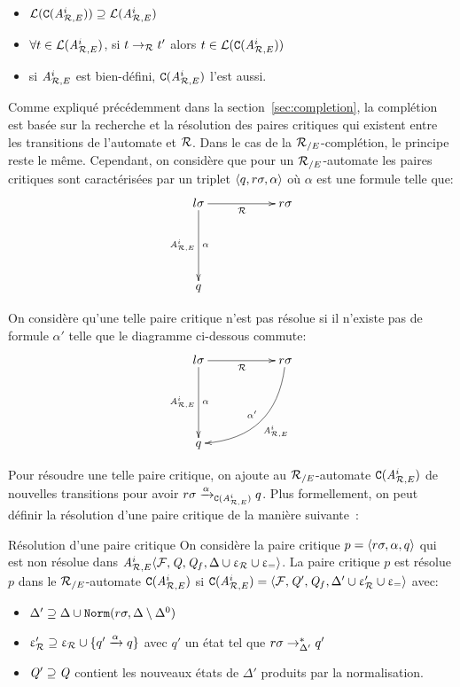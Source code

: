 \begin{itemize}
\item $\mathcal{L}(\mathtt{C}({\mathit A}_{\mathcal R,E}^i)) \supseteq \mathcal{L}({\mathit A}_{\mathcal R,E}^i)$
\item $\forall t \in \mathcal{L}({\mathit A}_{\mathcal R,E}^i)$, si $t \rightarrow_\mathcal R t'$ alors $t \in \mathcal{L}(\mathtt{C}({\mathit A}_{\mathcal R,E}^i))$
\item si ${\mathit A}_{\mathcal R,E}^i$ est bien-défini, $\mathtt{C}({\mathit A}_{\mathcal R,E}^i)$ l'est aussi.
\end{itemize}


Comme expliqué précédemment dans la section~\ref{sec:completion}, la complétion est basée sur
la recherche et la résolution des paires critiques qui existent entre les transitions de l'automate 
et $\mathcal R$. Dans le cas de la ${\mathcal R_{/E}}$-complétion, le principe reste le même. Cependant, on considère
que pour un ${\mathcal R_{/E}}$-automate les paires critiques sont caractérisées par un triplet $\langle q, r\sigma, \alpha\rangle$
où $\alpha$ est une formule telle que:
  \[
  \xymatrix{
    l\sigma \ar[dd]_{\aaexeq^i}^{\alpha} \ar[rr]_{\R} && r\sigma\\
    \\
    q
  }
  \]

On considère qu'une telle paire critique n'est pas résolue si il n'existe pas de formule $\alpha'$ telle que 
le diagramme ci-dessous commute:
  \[
  \xymatrix{
    l\sigma \ar[dd]_{\aaexeq^i}^{\alpha} \ar[rr]_{\R} && r\sigma \ar@/^1.8pc/[ddll]_{\alpha'}^{\aaexeq^i}\\
    \\
    q
  }
  \]

Pour résoudre une telle paire critique, on ajoute au ${\mathcal R_{/E}}$-automate $\mathtt{C}({\mathit A}_{\mathcal R,E}^i)$
de nouvelles transitions pour avoir $r\sigma \xrightarrow{\alpha}_{\mathtt{C}({\mathit A}_{\mathcal R,E}^{i})} q$.
Plus formellement, on peut définir la résolution d'une paire critique de la manière suivante~:

\begin{definition}{Résolution d'une paire critique}
  \label{def:resolution_cp}
  On considère la paire critique $p=\langle r\sigma, \alpha, q \rangle$ qui est non résolue dans
  ${\mathit A}_{\mathcal R,E}^i \langle \mathcal{F}, \mathit Q, \mathit Q_f, \Delta\cup \upvarepsilon_{\mathcal R}\cup \upvarepsilon_{=} \rangle$.
  La paire critique $p$ est résolue $p$ dans le ${\mathcal R_{/E}}$-automate $\mathtt{C}({\mathit A}_{\mathcal R,E}^i)$
  si $\mathtt{C}({\mathit A}_{\mathcal R,E}^i) = \langle \mathcal{F}, \mathit Q', \mathit Q_f, \Delta'\cup \upvarepsilon_{\mathcal R}'\cup \upvarepsilon_{=} \rangle$ avec:
  \begin{itemize}
  \item $\Delta'\supseteq \Delta \cup \mathtt{Norm}(r\sigma,\Delta\setminus \Delta^0)$
  \item $\upvarepsilon_{\mathcal R}'\supseteq \upvarepsilon_{\mathcal R} \cup \{q' \xrightarrow{\alpha} q\}$ avec $q'$ un état tel que $r\sigma \rightarrow^*_{\Delta'} q'$
  \item $\mathit Q' \supseteq \mathit Q$ contient les nouveaux états de $\Delta'$ produits par la normalisation.
  \end{itemize}
\end{definition}

